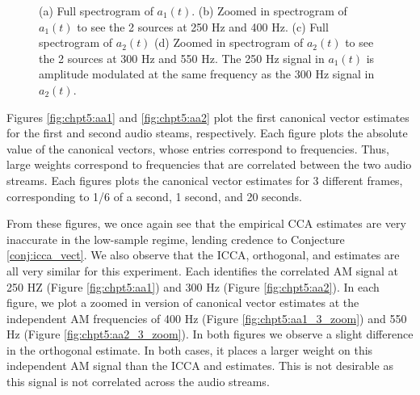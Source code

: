 \begin{figure}
\begin{center}
{    }
    \caption{(a) Full spectrogram of $a_1(t)$. (b) Zoomed in spectrogram of $a_1(t)$ to
      see the 2 sources at 250 Hz and 400 Hz. (c) Full spectrogram of $a_2(t)$ (d) Zoomed
      in spectrogram of $a_2(t)$ to see the 2 sources at 300 Hz and 550 Hz. The 250 Hz
      signal in $a_1(t)$ is amplitude modulated at the same frequency as the 300 Hz signal
      in $a_2(t)$.}
    \label{fig:chpt5:aa_spectrograms}
  \end{center}
\end{figure}

Figures \ref{fig:chpt5:aa1} and \ref{fig:chpt5:aa2} plot the first canonical vector
estimates for the first and second audio steams, respectively. Each figure plots the
absolute value of the canonical vectors, whose entries correspond to frequencies. Thus,
large weights correspond to frequencies that are correlated between the two audio
streams. Each figures plots the canonical vector estimates for 3 different frames,
corresponding to 1/6 of a second, 1 second, and 20 seconds.

From these figures, we once again see that the empirical CCA estimates are very inaccurate
in the low-sample regime, lending credence to Conjecture \ref{conj:icca_vect}. We also
observe that the ICCA, orthogonal, and \iccap estimates are all very similar for this
experiment. Each identifies the correlated AM signal at 250 HZ (Figure
\ref{fig:chpt5:aa1}) and 300 Hz (Figure \ref{fig:chpt5:aa2}). In each figure, we plot a
zoomed in version of canonical vector estimates at the independent AM frequencies of 400 Hz
(Figure \ref{fig:chpt5:aa1_3_zoom}) and 550 Hz (Figure \ref{fig:chpt5:aa2_3_zoom}). In
both figures we observe a slight difference in the orthogonal estimate. In both
cases, it places a larger weight on this independent AM signal than the ICCA and
\iccap estimates. This is not desirable as this signal is not correlated across the audio
streams.


